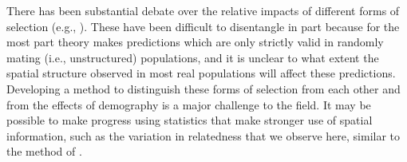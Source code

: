 \documentclass[11pt, oneside]{article}   	%
\newcommand\citet{\cite}
\renewcommand{\revpoint}[2]{\relax}
\begin{document}
There has been substantial debate over the relative impacts of different forms of selection
(e.g., \citet{charlesworth1997effects,charlesworth2012effects,pease2013accurate,hedrick2013adaptive,burri2015linked,corbettdetig2015natural,harris2016genetic,martin2016natural,phung2016determining,stankowski2018tempo}). %
These have been difficult to disentangle in part because for the most part
theory makes predictions which are only strictly valid 
in randomly mating (i.e., unstructured) populations,
and it is unclear to what extent the spatial structure observed in most real populations 
will affect these predictions.
Developing a method to distinguish these forms of selection from each other
and from the effects of demography is a major challenge to the field.
It may be possible to make progress using statistics that make stronger use of spatial information,
such as the variation in relatedness that we observe here,
similar to the method of \citet{beeravolu2018blockwise}. \revpoint{1}{2}
\end{document}
